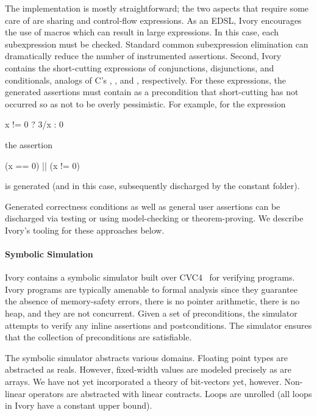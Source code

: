 The implementation is mostly straightforward; the two aspects that require some
care of are sharing and control-flow expressions. As an EDSL, Ivory encourages
the use of macros which can result in large expressions. In this case, each
subexpression must be checked. Standard common subexpression elimination can
dramatically reduce the number of instrumented assertions. Second, Ivory contains
the short-cutting expressions of conjunctions, disjunctions, and conditionals,
analogs of C's \cd{\&\&}, \cd{||}, and , respectively. For these
expressions, the generated assertions must contain as a precondition that
short-cutting has not occurred so as not to be overly pessimistic. For example,
for the expression
\noindent
\begin{code}
x != 0 ? 3/x : 0
\end{code}
\noindent
the assertion
\begin{code}
(x == 0) || (x != 0)
\end{code}
\noindent
is generated (and in this case, subsequently discharged by the constant folder).

Generated correctness conditions as well as general user assertions can be
discharged via testing or using model-checking or theorem-proving. We describe
Ivory's tooling for these approaches below.

\paragraph{Symbolic Simulation}
Ivory contains a symbolic simulator built over CVC4~\cite{cvc4} for verifying
programs. Ivory programs are typically amenable to formal analysis since they
guarantee the absence of memory-safety errors, there is no pointer arithmetic,
there is no heap, and they are not concurrent. Given a set of preconditions, the
simulator attempts to verify any inline assertions and postconditions. The
simulator ensures that the collection of preconditions are satisfiable.

The symbolic simulator abstracts various domains. Floating point types are
abstracted as reals. However, fixed-width values are modeled precisely as are
arrays. We have not yet incorporated a theory of bit-vectors yet,
however.  Non-linear operators are abstracted with linear contracts. Loops are
unrolled (all loops in Ivory have a constant upper bound).

